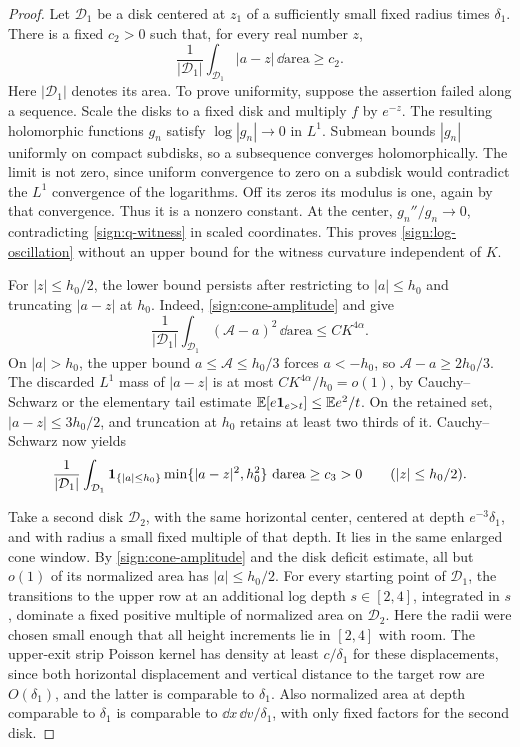 \begin{proof}
Let \(\mathcal D_1\) be a disk centered at \(z_1\) of a sufficiently
small fixed radius times \(\delta_1\).  There is a fixed \(c_2>0\)
such that, for every real number \(z\),
\begin{equation}\label{sign:log-oscillation}
 \frac1{|\mathcal D_1|}\int_{\mathcal D_1}
       |a-z|\,\dd\mathrm{area}\ge c_2.
\end{equation}
Here \(|\mathcal D_1|\) denotes its area.  To prove uniformity,
suppose the assertion failed along a
sequence.  Scale the disks to a fixed disk and multiply \(f\) by
\(e^{-z}\).  The resulting holomorphic functions \(g_n\) satisfy
\(\log|g_n|\to0\) in \(L^1\).  Submean bounds \(|g_n|\) uniformly
on compact subdisks, so a subsequence converges holomorphically.
The limit is not zero, since uniform convergence to zero on a
subdisk would contradict the \(L^1\) convergence of the logarithms.
Off its zeros its modulus is one, again by that convergence.  Thus
it is a nonzero constant.  At the center,
\(g_n''/g_n\to0\), contradicting \eqref{sign:q-witness} in scaled
coordinates.  This proves \eqref{sign:log-oscillation} without an
upper bound for the witness curvature independent of \(K\).

For \(|z|\le h_0/2\), the lower bound persists after restricting to
\(|a|\le h_0\) and truncating \(|a-z|\) at \(h_0\).  Indeed,
\eqref{sign:cone-amplitude} and  give
\[
 \frac1{|\mathcal D_1|}\int_{\mathcal D_1}(\mathcal A-a)^2
                 \,\dd\mathrm{area}\le CK^{4\alpha}.
\]
On \(|a|>h_0\), the upper bound \(a\le\mathcal A\le h_0/3\)
forces \(a<-h_0\), so \(\mathcal A-a\ge2h_0/3\).
The discarded \(L^1\) mass of \(|a-z|\) is at most
\(CK^{4\alpha}/h_0=o(1)\), by Cauchy--Schwarz or the elementary
tail estimate \(\mathbb E[e\mathbf 1_{e>t}]\le\mathbb E e^2/t\).
On the retained set, \(|a-z|\le3h_0/2\), and truncation at \(h_0\)
retains at least two thirds of it.  Cauchy--Schwarz now yields
\begin{equation}\label{sign:truncated-witness}
 \frac1{|\mathcal D_1|}\int_{\mathcal D_1}\mathbf 1_{\{|a|\le h_0\}}
          \min\{|a-z|^2,h_0^2\}\,\,\mathrm d\mathrm{area}
       \ge c_3>0\qquad (|z|\le h_0/2).
\end{equation}

Take a second disk \(\mathcal D_2\), with the same horizontal
center, centered at depth \(e^{-3}\delta_1\), and with radius a
small fixed multiple of that depth.  It lies in the same enlarged
cone window.  By \eqref{sign:cone-amplitude} and the disk deficit
estimate, all but \(o(1)\) of its normalized area has
\(|a|\le h_0/2\).  For every starting point of \(\mathcal D_1\),
the transitions to the upper row at an additional log depth
\(s\in[2,4]\), integrated in \(s\), dominate a fixed positive
multiple of normalized area on \(\mathcal D_2\).  Here the radii
were chosen small enough that all height increments lie in \([2,4]\)
with room.  The upper-exit strip Poisson kernel has density at least
\(c/\delta_1\) for these displacements, since both horizontal
displacement and vertical distance to the target row are
\(O(\delta_1)\), and the latter is comparable to \(\delta_1\).
Also normalized area at depth comparable to \(\delta_1\) is
comparable to \(\dd x\,\dd v/\delta_1\), with only fixed factors
for the second disk.


\end{proof}
